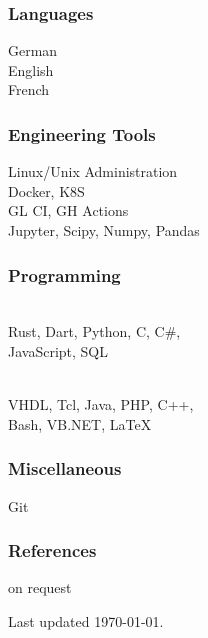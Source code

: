 \begin{facts}
    \subsubsection{Languages}
    German \\
    English \\
    French 
    \sectionsep
    
    \subsubsection{Engineering Tools}
    Linux/Unix Administration\\
    Docker, K8S\\
    GL CI, GH Actions\\
    Jupyter, Scipy, Numpy, Pandas
    \sectionsep
    
    \subsubsection{Programming}
    \\
    Rust, Dart, Python, C, C\#,\\
    JavaScript, SQL
    \sectionsep
    
    \\
    VHDL, Tcl, Java, PHP, C++,\\
    Bash, VB.NET, LaTeX
    \sectionsep
    
    \subsubsection{Miscellaneous}
    Git
    \sectionsep
    
    \subsubsection{References}
    on request
    
    \sectionsep
    Last updated \today.
    
    \end{facts}%
